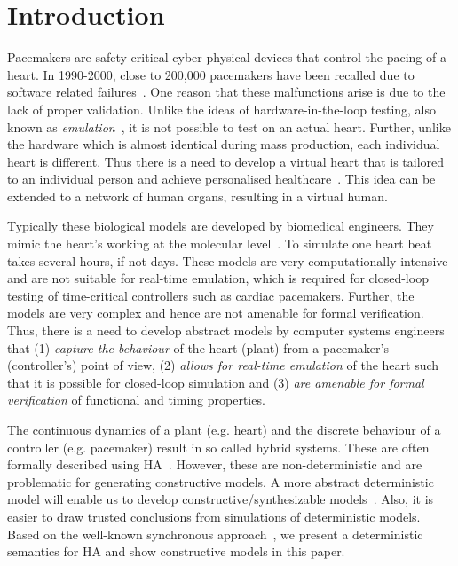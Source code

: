 \section{Introduction}

Pacemakers are safety-critical cyber-physical devices 
that control the pacing of a heart.
In 1990-2000, close to 200,000 pacemakers have been recalled
due to software related failures~\cite{alemzadeh13}.
 One reason that these malfunctions
arise is due to the lack of proper validation.
Unlike the ideas of hardware-in-the-loop testing,
also known as \emph {emulation}~\cite{patel2015survey},
it is not possible to test on an actual heart.
Further, unlike the hardware which is almost identical 
during mass production, each individual heart is different.
Thus there is a need to develop a virtual heart that is tailored
to an individual person and achieve
personalised healthcare~\cite{Trayanova2014}. 
This idea can be extended 
to a network of human organs, resulting in a virtual human.

Typically these biological  models are  developed by biomedical engineers.
They mimic the heart's working at the
molecular level~\cite{Trayanova2014}. 
To simulate one heart beat takes several hours, if not days.
These models are very computationally intensive and 
are not suitable for real-time emulation,
which is required for closed-loop testing of time-critical 
controllers such as cardiac pacemakers.
Further, the models are 
 very complex and hence 
 are not amenable for  formal verification. 
Thus, there is a need to develop abstract models 
by computer systems engineers that  
(1)  \emph{capture the behaviour} of the heart (plant) 
from a pacemaker's (controller's) point of view,
(2) \emph{allows for real-time emulation} of the heart 
such that it is possible for closed-loop simulation and
(3) \emph{are amenable for formal verification} of 
functional and timing properties.


The continuous dynamics of a plant (e.g. heart) and
 the discrete behaviour of a controller (e.g. pacemaker) 
 result in so called hybrid systems. 
 These are often formally described using \acf{HA}~\cite{alur2015principles,raskin05,chen201487}.
 However, these are non-deterministic and are problematic
 for generating constructive models.
 A more abstract deterministic model will enable us to
 develop constructive/synthesizable models~\cite{Lee2014}. Also, 
 it is easier to draw trusted conclusions from simulations
 of deterministic models. Based on the
 well-known synchronous approach~\cite{benveniste03}, 
 we present a deterministic semantics for \ac{HA} and show
 constructive models in this paper.



